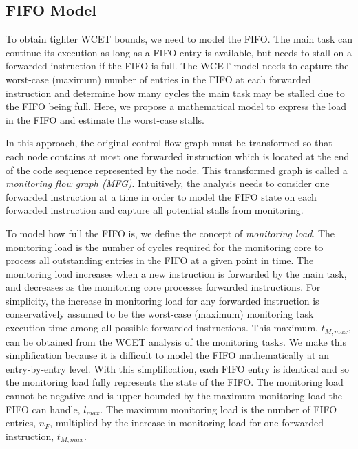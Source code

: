 \subsection{FIFO Model}
\label{sec:formulation:model}

To obtain tighter WCET bounds, we need to model the FIFO.
The main task can continue its execution as long as a
FIFO entry is available, but needs to stall on a forwarded instruction if
the FIFO is full. The WCET model needs to capture the worst-case (maximum)
number of entries in the FIFO at each forwarded instruction and determine
how many cycles the main task may be stalled due to the FIFO being full. Here,
we propose a mathematical model to express the load in the FIFO and estimate the worst-case stalls.


In this approach, the original control flow graph must be transformed so that 
each node contains at most one forwarded instruction which is located at the
end of the code sequence represented by the node.
This transformed graph is called a {\em monitoring flow graph (MFG)}.
Intuitively, the analysis needs to consider one forwarded instruction at a time
in order to model the FIFO state on each
forwarded instruction and capture all potential stalls from monitoring. 

To model how full the FIFO is, we define the concept of \emph{monitoring load}.
The monitoring load is the number of cycles required for the monitoring core 
to process all outstanding entries in the FIFO at a given point in time.
The monitoring load increases when a new instruction is 
forwarded by the main task, and decreases as the monitoring core processes
forwarded instructions.  For simplicity, the increase in monitoring load
for any forwarded instruction is conservatively assumed to be the worst-case (maximum) monitoring task
execution time among all possible forwarded instructions. This maximum, $t_{M, max}$, can be obtained from the WCET analysis of the monitoring tasks.
We make this simplification because it is difficult to model the FIFO
mathematically at an entry-by-entry level. With this simplification, each FIFO
entry is identical and so the monitoring load fully represents the state of the FIFO.
The monitoring load cannot be negative and is upper-bounded by the maximum
monitoring load the FIFO can handle, $l_{max}$.  The maximum monitoring load is
the number of FIFO entries, $n_F$, multiplied by the 
increase in monitoring load for one forwarded instruction, $t_{M, max}$.

